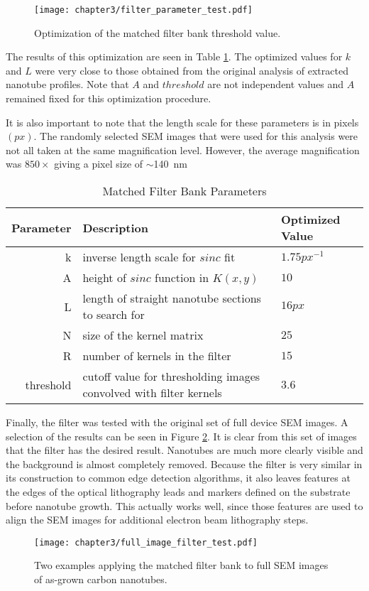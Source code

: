 \begin{figure}
	\centering
	\texttt{[image: chapter3/filter\_parameter\_test.pdf]}
	\caption{Optimization of the matched filter bank threshold value.}
	\label{fig:filter_parameter_test}
\end{figure}

The results of this optimization are seen in Table \ref{table:filter_parameters}. The optimized values for $k$ and $L$ were very close to those obtained from the original analysis of extracted nanotube profiles. Note that $A$ and $threshold$ are not independent values and $A$ remained fixed for this optimization procedure. 

It is also important to note that the length scale for these parameters is in pixels $(px)$. The randomly selected SEM images that were used for this analysis were not all taken at the same magnification level. However, the average magnification was $850\times$ giving a pixel size of $\sim$\SI{140}{\nano\meter}

\begin{table}
	\centering
	\caption{Matched Filter Bank Parameters}
    \begin{tabular}{| r | p{60mm} | l |}
    	\hline
    	\textbf{Parameter} & \textbf{Description} & \textbf{Optimized Value}  \\ \hline
    	k & inverse length scale for $sinc$ fit &  $1.75 px^{-1}$ \\ \hline
    	A & height of $sinc$ function in $K(x,y)$ &  $10$ \\ \hline
    	L & length of straight nanotube sections to search for &  $16 px$ \\ \hline
    	N & size of the kernel matrix &  $25$ \\ \hline
        R & number of kernels in the filter & $15$ \\ \hline
        threshold & cutoff value for thresholding images convolved with filter kernels & $3.6$ \\ \hline
    \end{tabular}
    \label{table:filter_parameters}
\end{table}

Finally, the filter was tested with the original set of full device SEM images. A selection of the results can be seen in Figure \ref{fig:full_image_filter}. It is clear from this set of images that the filter has the desired result. Nanotubes are much more clearly visible and the background is almost completely removed. Because the filter is very similar in its construction to common edge detection algorithms, it also leaves features at the edges of the optical lithography leads and markers defined on the substrate before nanotube growth. This actually works well, since those features are used to align the SEM images for additional electron beam lithography steps. 

\begin{figure}
	\centering
	\texttt{[image: chapter3/full\_image\_filter\_test.pdf]}
	\caption{Two examples applying the matched filter bank to full SEM images of as-grown carbon nanotubes.}
	\label{fig:full_image_filter}
\end{figure}